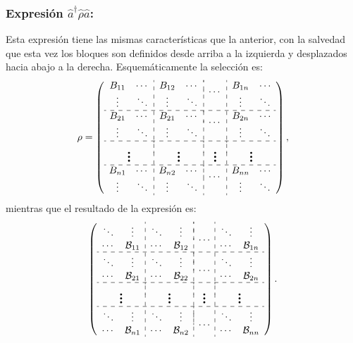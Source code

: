 \subsubsection*{Expresi\'on $\hat{a}^{\dag}\hat{\rho}\hat{a}$: } Esta expresi\'on tiene las mismas caracter\'isticas que la anterior, con la salvedad que esta vez los bloques son definidos desde arriba a la izquierda y desplazados hacia abajo a la derecha. Esquem\'aticamente la selecci\'on es:\begin{equation}\rho=\left(
 \begin{array}{cc:cc:cc:cc}
B_{11} & \cdots & B_{12} & \cdots & \multicolumn{2}{:c:}{\multirow{2}{*}{$\cdots$} } & B_{1n}&\cdots \\
\vdots & \ddots & \vdots & \ddots & & & \vdots & \ddots \\\hdashline
B_{21} & \cdots & B_{21} & \cdots & \multicolumn{2}{:c:}{\multirow{2}{*}{$\cdots$} } & B_{2n}&\cdots \\
\vdots & \ddots & \vdots & \ddots & & & \vdots & \ddots \\\hdashline
\multicolumn{2}{c:}{\multirow{2}{*}{\Huge$\vdots$} } & \multicolumn{2}{:c:}{\multirow{2}{*}{\Huge$\vdots$} } & \multicolumn{2}{:c:}{\multirow{2}{*}{\Huge$\vdots$} }&\multicolumn{2}{:c}{\multirow{2}{*}{\Huge$\vdots$} }\\
&&&&&&& \\\hdashline

B_{n1} & \cdots & B_{n2} & \cdots & \multicolumn{2}{:c:}{\multirow{2}{*}{$\cdots$} } & B_{nn}&\cdots \\
\vdots & \ddots & \vdots & \ddots & & & \vdots & \ddots
\end{array}\right),
\end{equation}
mientras que el resultado de la expresi\'on es:\begin{equation}\left(
 \begin{array}{cc:cc:cc:cc}
\ddots&\vdots& \ddots&\vdots& \multicolumn{2}{:c:}{\multirow{2}{*}{$\mathbf{\cdots}$} } &\ddots &\vdots \\
\cdots&\mathcal{B}_{11}& \cdots & \mathcal{B}_{12}& & &\cdots& \mathcal{B}_{1n}\\\hdashline

\ddots&\vdots& \ddots&\vdots& \multicolumn{2}{:c:}{\multirow{2}{*}{$\mathbf{\cdots}$} } & \ddots&\vdots \\
\cdots&\mathcal{B}_{21}& \cdots & \mathcal{B}_{22}& & &\cdots& \mathcal{B}_{2n}\\\hdashline
\multicolumn{2}{c:}{\multirow{2}{*}{\Huge$\vdots$} } & \multicolumn{2}{:c:}{\multirow{2}{*}{\Huge$\vdots$} } & \multicolumn{2}{:c:}{\multirow{2}{*}{\Huge$\vdots$} }&\multicolumn{2}{:c}{\multirow{2}{*}{\Huge$\vdots$} }\\
&&&&&&& \\\hdashline
\ddots&\vdots& \ddots&\vdots& \multicolumn{2}{:c:}{\multirow{2}{*}{$\mathbf{\cdots}$} } & \ddots&\vdots \\
\cdots&\mathcal{B}_{n1}& \cdots & \mathcal{B}_{n2}& & &\cdots& \mathcal{B}_{nn}
\end{array}\right).
\end{equation}
